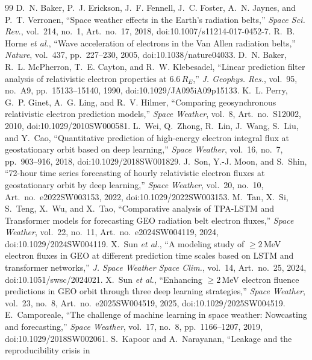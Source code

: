 \documentclass[conference,a4paper]{IEEEtran}
\begin{document}
\FloatBarrier
\begin{thebibliography}{99}
\footnotesize
{}
D.~N. Baker, P.~J. Erickson, J.~F. Fennell, J.~C. Foster, A.~N. Jaynes, and
P.~T. Verronen, ``Space weather effects in the Earth's radiation belts,''
\emph{Space Sci. Rev.}, vol.~214, no.~1, Art.~no.~17, 2018,
doi:10.1007/s11214-017-0452-7.
R.~B. Horne \emph{et al.}, ``Wave acceleration of electrons in the Van Allen
radiation belts,'' \emph{Nature}, vol.~437, pp.~227--230, 2005,
doi:10.1038/nature04033.
D.~N. Baker, R.~L. McPherron, T.~E. Cayton, and R.~W. Klebesadel, ``Linear
prediction filter analysis of relativistic electron properties at
6.6\,\(R_E\),'' \emph{J. Geophys. Res.}, vol.~95, no.~A9, pp.~15133--15140,
1990, doi:10.1029/JA095iA09p15133.
K.~L. Perry, G.~P. Ginet, A.~G. Ling, and R.~V. Hilmer, ``Comparing
geosynchronous relativistic electron prediction models,'' \emph{Space
Weather}, vol.~8, Art.~no.~S12002, 2010, doi:10.1029/2010SW000581.
L.~Wei, Q.~Zhong, R.~Lin, J.~Wang, S.~Liu, and Y.~Cao, ``Quantitative
prediction of high-energy electron integral flux at geostationary orbit based
on deep learning,'' \emph{Space Weather}, vol.~16, no.~7, pp.~903--916, 2018,
doi:10.1029/2018SW001829.
J.~Son, Y.-J. Moon, and S.~Shin, ``72-hour time series forecasting of hourly
relativistic electron fluxes at geostationary orbit by deep learning,''
\emph{Space Weather}, vol.~20, no.~10, Art.~no.~e2022SW003153, 2022,
doi:10.1029/2022SW003153.
M.~Tan, X.~Si, S.~Teng, X.~Wu, and X.~Tao, ``Comparative analysis of TPA-LSTM
and Transformer models for forecasting GEO radiation belt electron fluxes,''
\emph{Space Weather}, vol.~22, no.~11, Art.~no.~e2024SW004119, 2024,
doi:10.1029/2024SW004119.
X.~Sun \emph{et al.}, ``A modeling study of \({\geq}2\)\,MeV electron fluxes in
GEO at different prediction time scales based on LSTM and transformer
networks,'' \emph{J. Space Weather Space Clim.}, vol.~14, Art.~no.~25, 2024,
doi:10.1051/swsc/2024021.
X.~Sun \emph{et al.}, ``Enhancing \({\geq}2\)\,MeV electron fluence predictions
in GEO orbit through three deep learning strategies,'' \emph{Space Weather},
vol.~23, no.~8, Art.~no.~e2025SW004519, 2025, doi:10.1029/2025SW004519.
E.~Camporeale, ``The challenge of machine learning in space weather:
Nowcasting and forecasting,'' \emph{Space Weather}, vol.~17, no.~8,
pp.~1166--1207, 2019, doi:10.1029/2018SW002061.
S.~Kapoor and A.~Narayanan, ``Leakage and the reproducibility crisis in

\end{thebibliography}
\end{document}
